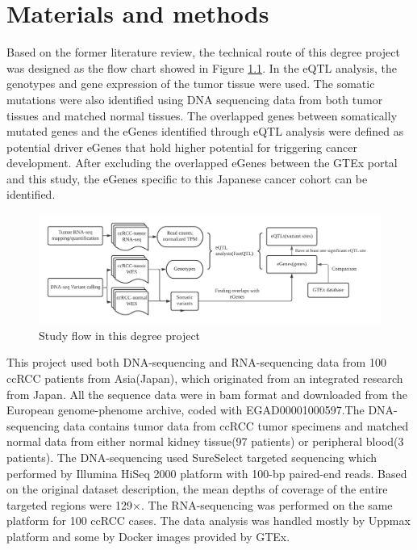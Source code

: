 \chapter{Materials and methods}

Based on the former literature review, the technical route of this degree project was designed as the flow chart showed in Figure \ref{flow-chart}. In the eQTL analysis, the genotypes and gene expression of the tumor tissue were used. The somatic mutations were also identified using DNA sequencing data from both tumor tissues and matched normal tissues. The overlapped genes between somatically mutated genes and the eGenes identified through eQTL analysis were defined as potential driver eGenes that hold higher potential for triggering cancer development. After excluding the overlapped eGenes between the GTEx portal and this study, the eGenes specific to this Japanese cancer cohort can be identified.


\begin{figure}[h]
\centering
\includegraphics[width=1.0\textwidth]{figures/eQTL-analysis (3).png}
\caption{Study flow in this degree project}
\label{flow-chart}
\end{figure}

This project used both DNA-sequencing and RNA-sequencing data from 100 ccRCC patients from Asia(Japan), which originated from an integrated research from Japan\cite{sato_integrated_2013}. All the sequence data were in bam format and downloaded from the European genome-phenome archive, coded with EGAD00001000597.The DNA-sequencing data contains tumor data from ccRCC tumor specimens and matched normal data from either normal kidney tissue(97 patients) or peripheral blood(3 patients). The DNA-sequencing used SureSelect targeted sequencing which performed by Illumina HiSeq 2000 platform with 100-bp paired-end reads. Based on the original dataset description, the mean depths of coverage of the entire targeted regions were 129×. The RNA-sequencing was performed on the same platform for 100 ccRCC cases. The data analysis was handled mostly by Uppmax platform and some by Docker images provided by GTEx.\\

